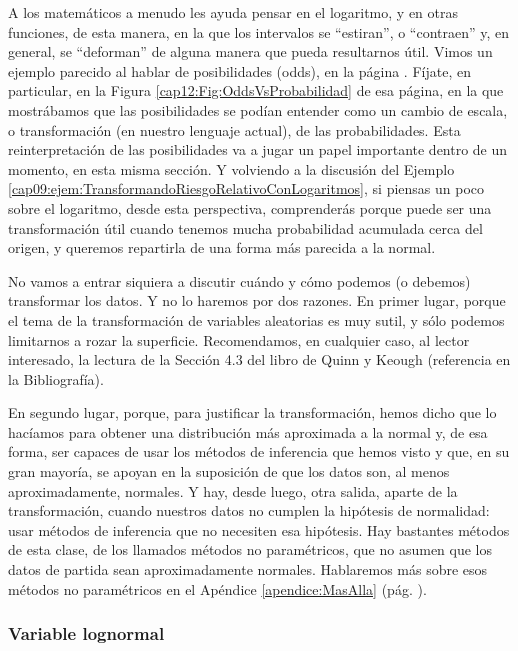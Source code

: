 A los matemáticos a menudo les ayuda pensar en el logaritmo, y en otras funciones, de esta manera, en la que los intervalos se ``estiran'', o ``contraen'' y, en general, se ``deforman'' de alguna manera que pueda resultarnos útil. Vimos un ejemplo parecido al hablar de posibilidades (odds), en la página \pageref{cap12:Fig:OddsVsProbabilidad}. Fíjate, en particular, en la Figura \ref{cap12:Fig:OddsVsProbabilidad} de esa página, en la que mostrábamos que las posibilidades se podían entender como un cambio de escala, o transformación (en nuestro lenguaje actual), de las probabilidades. Esta reinterpretación de las posibilidades va a jugar un papel importante dentro de un momento, en esta misma sección. Y volviendo a la discusión del Ejemplo \ref{cap09:ejem:TransformandoRiesgoRelativoConLogaritmos}, si piensas un poco sobre el logaritmo, desde esta perspectiva, comprenderás porque puede ser una transformación útil cuando tenemos mucha probabilidad acumulada cerca del origen, y queremos repartirla de una forma más parecida a la normal.

No vamos a entrar siquiera a discutir cuándo y cómo podemos (o debemos) transformar los datos. Y no lo haremos por dos razones. En primer lugar, porque el tema de la transformación de variables aleatorias es muy sutil, y  sólo podemos limitarnos a rozar la superficie. Recomendamos, en cualquier caso, al lector interesado, la lectura de la Sección 4.3 del libro de Quinn y Keough (referencia \cite{quinn2002experimental} en la Bibliografía).

En segundo lugar, porque, para justificar la transformación, hemos dicho que lo hacíamos para obtener una distribución más aproximada a la normal y, de esa forma, ser capaces de usar los métodos de inferencia que hemos visto y que, en su gran mayoría, se apoyan en
la suposición de que los datos son, al menos aproximadamente, normales. Y hay, desde luego, otra salida, aparte de la transformación, cuando nuestros datos no cumplen la hipótesis de normalidad: usar métodos de inferencia que no necesiten esa hipótesis. Hay bastantes métodos de esta clase, de los llamados {\sf métodos no paramétricos}, que no asumen que los datos de partida sean aproximadamente normales. Hablaremos más sobre esos métodos no paramétricos en el Apéndice \ref{apendice:MasAlla} (pág. \pageref{apendice:MasAlla}).

\subsubsection{Variable lognormal}
\label{cap09:subsubsec:VariableLogNormal}

